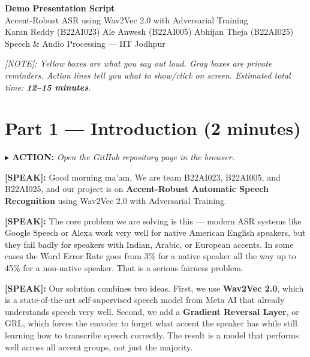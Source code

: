 \documentclass[12pt,a4paper]{article}
\newcommand{\say}[1]{%
  \begin{speakbox}
  \textbf{\color{speakblue}[SPEAK]:} #1
  \end{speakbox}
  \vspace{4pt}
}
\newcommand{\action}[1]{%
  \vspace{2pt}
  \noindent\textbf{\color{sectionred}$\blacktriangleright$ ACTION:} \textit{#1}
  \vspace{4pt}
}
\begin{document}
\begin{center}
  {\LARGE \textbf{Demo Presentation Script}}\\[6pt]
  {\large Accent-Robust ASR using Wav2Vec 2.0 with Adversarial Training}\\[4pt]
  {\normalsize Karan Reddy (B22AI023) \quad Ale Anwesh (B22AI005) \quad Abhijan Theja (B22AI025)}\\[4pt]
  {\small Speech \& Audio Processing --- IIT Jodhpur}
\end{center}

\vspace{4pt}
\begin{notebox}
\textit{[NOTE]: Yellow boxes are what you say out loud. Gray boxes are private reminders.
Action lines tell you what to show/click on screen. Estimated total time: \textbf{12--15 minutes}.}
\end{notebox}

\vspace{8pt}

\section{Part 1 --- Introduction (2 minutes)}

\action{Open the GitHub repository page in the browser.}

\say{Good morning ma'am. We are team B22AI023, B22AI005, and B22AI025, and our project is on
\textbf{Accent-Robust Automatic Speech Recognition} using Wav2Vec 2.0 with Adversarial Training.}

\say{The core problem we are solving is this --- modern ASR systems like Google Speech or Alexa
work very well for native American English speakers, but they fail badly for speakers with
Indian, Arabic, or European accents. In some cases the Word Error Rate goes from 3\% for a
native speaker all the way up to 45\% for a non-native speaker. That is a serious fairness
problem.}

\say{Our solution combines two ideas. First, we use \textbf{Wav2Vec 2.0}, which is a
state-of-the-art self-supervised speech model from Meta AI that already understands speech
very well. Second, we add a \textbf{Gradient Reversal Layer}, or GRL, which forces the encoder
to forget what accent the speaker has while still learning how to transcribe speech correctly.
The result is a model that performs well across all accent groups, not just the majority.}
\end{document}
